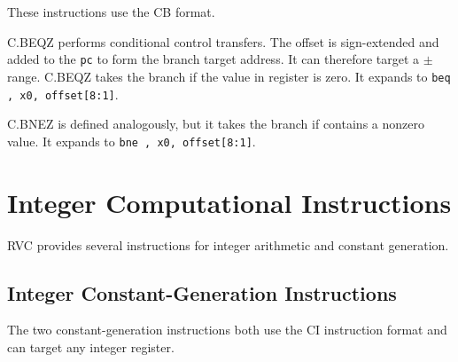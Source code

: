 These instructions use the CB format.

C.BEQZ performs conditional control transfers.  The offset is sign-extended
and added to the {\tt pc} to form the branch target address.  It can
therefore target a $\pm$ range.  C.BEQZ takes the branch if the
value in register {\em \rsoneprime} is zero.  It expands to {\tt beq \rsoneprime, x0,
offset[8:1]}.

C.BNEZ is defined analogously, but it takes the branch if {\em \rsoneprime} contains
a nonzero value.  It expands to {\tt bne \rsoneprime, x0, offset[8:1]}.

\section{Integer Computational Instructions}

RVC provides several instructions for integer arithmetic and constant generation.

\subsection*{Integer Constant-Generation Instructions}

The two constant-generation instructions both use the CI instruction
format and can target any integer register.

